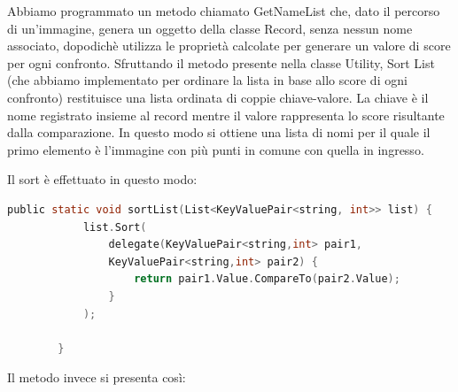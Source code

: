 \documentclass[twoside]{supsistudent}
\begin{document}
Abbiamo programmato un metodo chiamato GetNameList che, dato il percorso di un'immagine, genera un oggetto della classe Record, senza nessun nome associato, dopodichè utilizza le proprietà calcolate per generare un valore di score per ogni confronto. Sfruttando il metodo presente nella classe Utility, Sort List (che abbiamo implementato per ordinare la lista in base allo score di ogni confronto) restituisce una lista ordinata di coppie chiave-valore. La chiave è il nome registrato insieme al record mentre il valore rappresenta lo score risultante dalla comparazione. In questo modo si ottiene una lista di nomi per il quale il primo elemento è l'immagine con più punti in comune con quella in ingresso. 

Il sort è effettuato in questo modo:

\begin{lstlisting}[language=C]
  public static void sortList(List<KeyValuePair<string, int>> list) {
            list.Sort(
                delegate(KeyValuePair<string,int> pair1,
                KeyValuePair<string,int> pair2) {
                    return pair1.Value.CompareTo(pair2.Value);
                }
            );
          
        }
\end{lstlisting}

Il metodo invece si presenta così:
\end{document}
